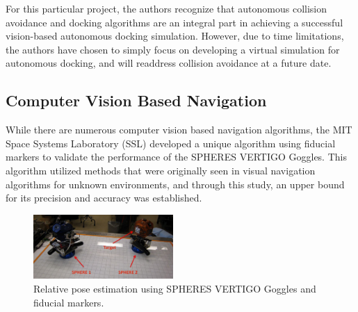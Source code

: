 \documentclass[journal, 10pt]{IEEEtran}
\begin{document}
For this particular project, the authors recognize that autonomous collision avoidance and docking algorithms are an integral part in achieving a successful vision-based autonomous docking simulation. However, due to time limitations, the authors have chosen to simply focus on developing a virtual simulation for autonomous docking, and will readdress collision avoidance at a future date.

\subsection{Computer Vision Based Navigation}

While there are numerous computer vision based navigation algorithms, the MIT Space Systems Laboratory (SSL) developed a unique algorithm using fiducial markers to validate the performance of the SPHERES VERTIGO Goggles. This algorithm utilized methods that were originally seen in visual navigation algorithms for unknown environments, and through this study, an upper bound for its precision and accuracy was established. 

\begin{figure}[tb]
\begin{center}
\includegraphics[width=0.475\textwidth]{figures/pose_est.pdf}
\caption{Relative pose estimation using SPHERES VERTIGO Goggles and fiducial markers.}
\label{target_plot}
\end{center}
\end{figure}
\end{document}
